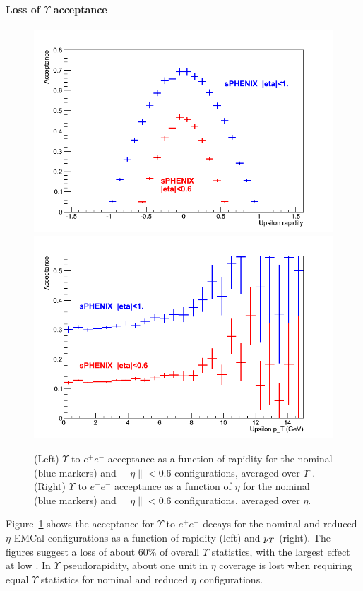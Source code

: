 \paragraph{Loss of $\Upsilon$ acceptance}
\begin{figure}[hbt]
  \centering
  \includegraphics[width=0.4\linewidth]{figs/upsilon_rate_y}
  \hspace{0.1\linewidth}
  \includegraphics[width=0.4\linewidth]{figs/upsilon_rate_pT}
  \caption{(Left)
  $\Upsilon$ to $e^+ e^-$ acceptance as a function of rapidity for the nominal (blue markers) and $\| \eta \| < 0.6$ configurations,
  averaged over $\Upsilon$ \pt. 
  (Right) $\Upsilon$ to $e^+ e^-$ acceptance as a function of $\eta$ for the nominal (blue markers) and $\| \eta \| < 0.6$ 
  configurations, averaged over $\eta$.}
  \label{fig:upsilon_rate}
\end{figure}

Figure~\ref{fig:upsilon_rate} shows the acceptance for $\Upsilon$ to $e^+ e^-$ decays for the nominal and reduced $\eta$ EMCal
configurations as a function of rapidity (left) and $\mbox{${p_T}$}$ (right). The figures suggest a loss of about 60\% of overall 
$\Upsilon$ statistics, with the largest effect at low \pt. In $\Upsilon$ pseudorapidity, about one unit in $\eta$ coverage is 
lost when requiring equal $\Upsilon$ statistics for nominal and reduced $\eta$ configurations.

